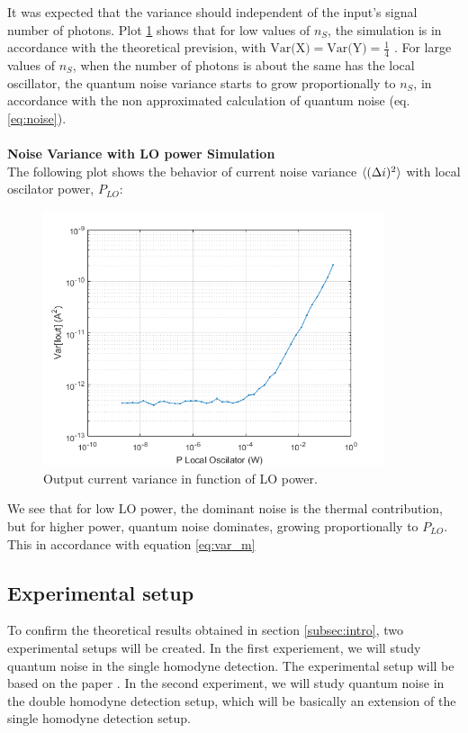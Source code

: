 \begin{bibunit}[plain]
\begin{figure}[H]
\label{fig:variance}
\end{figure}
%
It was expected that the variance should independent of the input's signal number of photons. Plot \ref{fig:variance} shows that for low values of $n_S$, the simulation is in accordance with the theoretical prevision, with $\textrm{Var(X)} = \textrm{Var(Y)} = \frac{1}{4}$ . For large values of $n_S$, when the number of photons is about the same has the local oscillator, the quantum noise variance starts to grow proportionally to $n_S$, in accordance with the non approximated calculation of quantum noise (eq. \ref{eq:noise}).\\
\\
{\bf Noise Variance with LO power Simulation}\\
The following plot shows the behavior of current noise variance $\braket{(\Delta i)^2}$ with local oscilator power, $P_{LO}$:
%
%
\begin{figure}[H]
	\centering
	\includegraphics[width=10cm]{./sdf/optical_detection/figures/power_plot.png}
	\caption{Output current variance in function of LO power.}
	\label{fig:variance_lo_power}
\end{figure}
%
%
We see that for low LO power, the dominant noise is the thermal contribution, but for higher power, quantum noise dominates, growing proportionally to $P_{LO}$. This in accordance with equation \ref{eq:var_m}\\
%
%
%
%
\subsection{Experimental setup}
%
To confirm the theoretical results obtained in section \ref{subsec:intro}, two experimental setups will be created. In the first experiement, we will study quantum noise in the single homodyne detection. The experimental setup will be based on the paper \cite{chi2011balanced}. In the second experiment, we will study quantum noise in the double homodyne detection setup, which will be basically an extension of the single homodyne detection setup.\\
\\

\end{bibunit}
